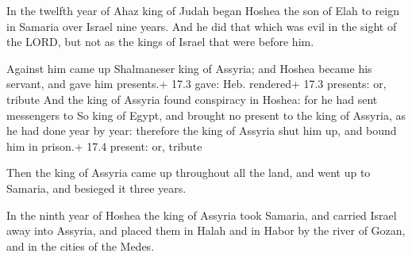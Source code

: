  In the twelfth year of Ahaz king of Judah began Hoshea the
son of Elah to reign in Samaria over Israel nine years.  And
he did that which was evil in the sight of the LORD, but not as the
kings of Israel that were before him.

 Against him came up Shalmaneser king of Assyria; and
Hoshea became his servant, and gave him presents.+ 17.3 gave: Heb.
rendered+ 17.3 presents: or, tribute  And the king of
Assyria found conspiracy in Hoshea: for he had sent messengers to So
king of Egypt, and brought no present to the king of Assyria, as he had
done year by year: therefore the king of Assyria shut him up, and bound
him in prison.+ 17.4 present: or, tribute

 Then the king of Assyria came up throughout all the land,
and went up to Samaria, and besieged it three years.

 In the ninth year of Hoshea the king of Assyria took
Samaria, and carried Israel away into Assyria, and placed them in Halah
and in Habor by the river of Gozan, and in the cities of the Medes.

